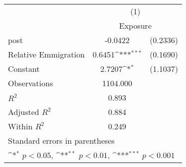 {
\def\sym#1{\ifmmode^{#1}\else\(^{#1}\)\fi}
\begin{tabular}{l*{1}{cc}}
\toprule
                &\multicolumn{2}{c}{(1)}     \\
                &\multicolumn{2}{c}{Exposure}\\
\midrule
post            &  -0.0422         & (0.2336)\\
Relative Emmigration&   0.6451\sym{***}& (0.1690)\\
Constant        &   2.7207\sym{*}  & (1.1037)\\
\midrule
Observations    & 1104.000         &         \\
\(R^{2}\)       &    0.893         &         \\
Adjusted \(R^{2}\)&    0.884         &         \\
Within \(R^{2}\)&    0.249         &         \\
\bottomrule
\multicolumn{3}{l}{\footnotesize Standard errors in parentheses}\\
\multicolumn{3}{l}{\footnotesize \sym{*} \(p<0.05\), \sym{**} \(p<0.01\), \sym{***} \(p<0.001\)}\\
\end{tabular}
}
